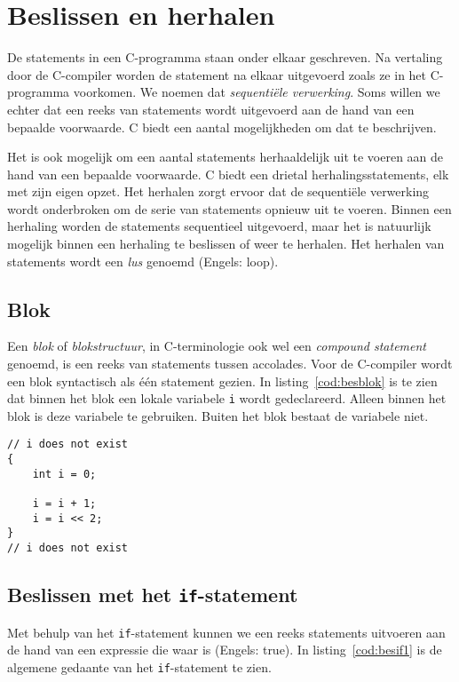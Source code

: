 \chapter{Beslissen en herhalen}
\label{cha:programmabesturing}
\thispagestyle{empty}

De statements in een C-programma staan onder elkaar geschreven. Na vertaling door de C-compiler worden de statement na elkaar uitgevoerd zoals ze in het C-programma voorkomen. We noemen dat \textsl{sequentiële verwerking}. Soms willen we echter dat een reeks van statements wordt uitgevoerd aan de hand van een bepaalde voorwaarde. C biedt een aantal mogelijkheden om dat te beschrijven.

Het is ook mogelijk om een aantal statements herhaaldelijk uit te voeren aan de hand van een bepaalde voorwaarde. C biedt een drietal herhalingsstatements, elk met zijn eigen opzet. Het herhalen zorgt ervoor dat de sequentiële verwerking wordt onderbroken om de serie van statements opnieuw uit te voeren. Binnen een herhaling worden de statements sequentieel uitgevoerd, maar het is natuurlijk mogelijk binnen een herhaling te beslissen of weer te herhalen. Het herhalen van statements wordt een \textsl{lus} genoemd (Engels: loop).


\section{Blok}
Een \textsl{blok} of \textsl{blokstructuur}, in C-terminologie ook wel een \textsl{compound statement} genoemd, is een reeks van statements tussen accolades. Voor de C-compiler wordt een blok syntactisch als één statement gezien. In listing~\ref{cod:besblok} is te zien dat binnen het blok een lokale variabele \texttt{i} wordt gedeclareerd. Alleen binnen het blok is deze variabele te gebruiken. Buiten het blok bestaat de variabele niet.


\begin{lstlisting}[caption=Een blok met een lokale variabele.,label=cod:besblok]
// i does not exist
{
    int i = 0;
    
    i = i + 1;
    i = i << 2;
}
// i does not exist
\end{lstlisting}


\section{Beslissen met het \texttt{if}-statement}
Met behulp van het \texttt{if}-statement kunnen we een reeks statements uitvoeren aan de hand van een expressie die waar is (Engels: true). In listing~\ref{cod:besif1} is de algemene gedaante van het \texttt{if}-statement te zien.

